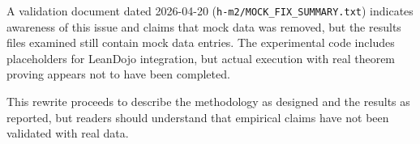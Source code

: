 A validation document dated 2026-04-20 (\texttt{h-m2/MOCK_FIX_SUMMARY.txt}) indicates awareness of this issue and claims that mock data was removed, but the results files examined still contain mock data entries. The experimental code includes placeholders for LeanDojo integration, but actual execution with real theorem proving appears not to have been completed.

This rewrite proceeds to describe the methodology as designed and the results as reported, but readers should understand that empirical claims have not been validated with real data.

